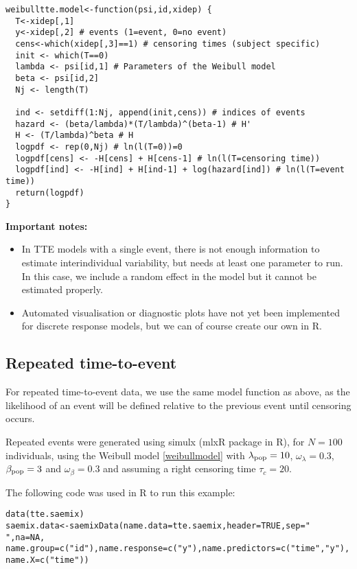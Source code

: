 {\begin{verbatim}
weibulltte.model<-function(psi,id,xidep) {
  T<-xidep[,1]
  y<-xidep[,2] # events (1=event, 0=no event)
  cens<-which(xidep[,3]==1) # censoring times (subject specific)
  init <- which(T==0)
  lambda <- psi[id,1] # Parameters of the Weibull model
  beta <- psi[id,2]
  Nj <- length(T)
  
  ind <- setdiff(1:Nj, append(init,cens)) # indices of events
  hazard <- (beta/lambda)*(T/lambda)^(beta-1) # H'
  H <- (T/lambda)^beta # H
  logpdf <- rep(0,Nj) # ln(l(T=0))=0
  logpdf[cens] <- -H[cens] + H[cens-1] # ln(l(T=censoring time))
  logpdf[ind] <- -H[ind] + H[ind-1] + log(hazard[ind]) # ln(l(T=event time))
  return(logpdf)
}
\end{verbatim}


{\bf Important notes:}
\begin{itemize}
\item In TTE models with a single event, there is not enough information to estimate interindividual variability, but \monolix needs at least one parameter to run. In this case, we include a random effect in the model but it cannot be estimated properly.
\item Automated visualisation or diagnostic plots have not yet been implemented for discrete response models, but we can of course create our own in R.
\end{itemize}

\paragraph{}


\subsection{Repeated time-to-event}

For repeated time-to-event data, we use the same model function as above, as the likelihood of an event will be defined relative to the previous event until censoring occurs.

Repeated events were generated using simulx (mlxR package in R), for $N=100$ individuals, using the Weibull model \eqref{weibullmodel} with $\lambda_{\rm pop} = 10$, $\omega_{\lambda} = 0.3$, $\beta_{\rm pop} = 3$ and $\omega_{\beta} = 0.3$ and assuming a right censoring time $\tau_c = 20$.

The following code was used in R to run this example:

\begin{verbatim}
data(tte.saemix)
saemix.data<-saemixData(name.data=tte.saemix,header=TRUE,sep=" ",na=NA, name.group=c("id"),name.response=c("y"),name.predictors=c("time","y"), name.X=c("time"))


\end{verbatim}}
